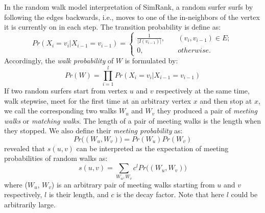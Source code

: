 \documentclass[conference]{IEEEtran}
\theoremstyle{definition}
\theoremstyle{definition}
\begin{document}
 In the random walk model interpretation of SimRank, a random surfer surfs by  following the edges backwards, i.e., moves to one of the in-neighbors of the vertex it is currently on in each step. 
 The transition probability is define as: 
\begin{equation}
Pr(X_i=v_i|X_{i-1}=v_{i-1}) = \left\{
        \begin{array}{ll}
	\frac{1}{|I(v_{i-1})|}, & \quad (v_i, v_{i-1}) \in E; \\
	0,  &\quad otherwise.
        \end{array}
    \right.
	\label{eq:four}
\end{equation}
Accordingly, the {\em walk probability} of $W$ is formulated by:
 \begin{equation}
Pr(W) = \prod_{i=1}^{l}Pr(X_i=v_i|X_{i-1}=v_{i-1})
	\label{eq:seven}
\end{equation}
 If two random surfers start from vertex $u$ and $v$ respectively  at the same time, walk stepwise,  meet for the first time at an arbitrary vertex $x$ and then stop at $x$,  we call the corresponding two walks $W_u$ and $W_v$ they produced a pair of {\em meeting walks} or {\em matching walks}.
 The length of a pair of meeting walks is the length when they stopped. 
 We also define their {\em meeting probability} as:
 \begin{equation}
Pr\big((W_u, W_v)\big) = Pr(W_u)Pr(W_v)
	\label{eq:five}
\end{equation}
\cite{jeh2002simrank} revealed that $s(u, v)$ can be interpreted as the expectation of meeting probabilities of random walks as:
  \begin{equation}
s(u,v) = \sum\limits_{W_u, W_v} c^lPr\big((W_u, W_v)\big)
	\label{eq:six}
\end{equation}
where ($W_u$, $W_v$) is an arbitrary pair of meeting walks starting from $u$ and $v$ respectively, $l$ is their length, and $c$ is the decay factor.
Note that here $l$ could be arbitrarily large.
\end{document}
